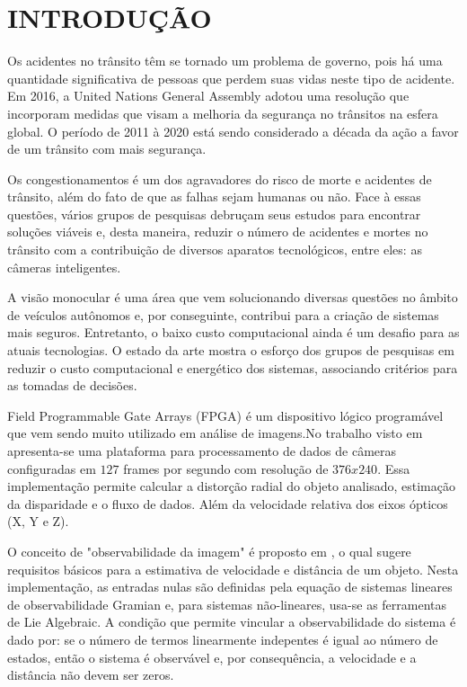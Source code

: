 \section{INTRODUÇÃO}

Os acidentes no trânsito têm se tornado um problema de governo, pois há uma quantidade significativa de pessoas que
perdem suas vidas neste tipo de acidente. Em 2016, a United Nations General Assembly adotou uma resolução que incorporam medidas que visam 
a melhoria da segurança no trânsitos na esfera global. O período de 2011 à 2020 está sendo considerado a década da ação a favor
de um trânsito com mais segurança.

Os congestionamentos é um dos agravadores do risco de morte e acidentes de trânsito, além do fato de que as falhas sejam humanas ou não. 
Face à essas questões, vários grupos de pesquisas debruçam seus estudos para encontrar soluções viáveis e, desta maneira,
reduzir o número de acidentes e mortes no trânsito com a contribuição de diversos aparatos tecnológicos, entre eles: as câmeras inteligentes.

A visão monocular é uma área que vem solucionando diversas questões no âmbito de veículos autônomos e, por conseguinte, 
contribui para a criação de sistemas mais seguros. Entretanto, o baixo custo computacional ainda é um desafio 
para as atuais tecnologias. O estado da arte mostra o esforço dos grupos de pesquisas em reduzir o custo computacional 
e energético dos sistemas, associando critérios para as tomadas de decisões.

Field Programmable Gate Arrays (FPGA) é um dispositivo lógico programável que vem sendo muito utilizado em análise de imagens.No trabalho visto em
\cite{Honegger}
apresenta-se uma plataforma para processamento de dados de câmeras configuradas em $127$ frames por segundo com resolução de $376x240$. Essa 
implementação permite calcular a distorção radial do objeto analisado, estimação da disparidade e o fluxo de dados. Além da 
velocidade relativa dos eixos ópticos (X, Y e Z).

O conceito de "observabilidade da imagem" é proposto em \cite{Breugel}, o qual sugere requisitos básicos para a estimativa de velocidade e 
distância de um objeto. Nesta implementação, as entradas nulas são definidas pela equação de sistemas lineares de observabilidade Gramian e,
para sistemas não-lineares, usa-se as ferramentas de Lie Algebraic. A condição que permite vincular a observabilidade do sistema é dado por:
se o número de termos linearmente indepentes é igual ao número de estados, então o sistema é observável e, por consequência, a velocidade e a 
distância não devem ser zeros.

